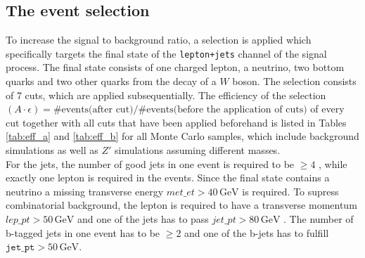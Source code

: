 \subsection{The event selection}
To increase the signal to background ratio, a selection is applied which specifically targets the final state of the \texttt{lepton+jets}
channel of the signal process.
The final state consists of one charged lepton, a neutrino, two bottom quarks and two other quarks from the
decay of a $W$ boson. The selection consists of 7 cuts, which are applied subsequentially.
The efficiency of the selection $(A \cdot \epsilon) = \# \text{events(after cut)} / \# \text{events(before the application of cuts)}$ of every cut together with all
cuts that have been applied beforehand is listed in Tables \ref{tab:eff_a} and \ref{tab:eff_b} for all Monte Carlo samples, which include background simulations as well as $Z\prime$ simulations assuming different masses.\\
For the jets, the number of good jets in one event is required to be $\geq 4$
, while exactly one lepton is required
in the events. Since the final state contains a neutrino
a missing
transverse energy $met\_et > 40 \, \si{\giga\eV}$
 is required. To supress combinatorial background,
the lepton is required to have a transverse momentum $lep\_pt > 50 \, \si{\giga\eV}$
 and one of
the jets has to pass $jet\_pt > 80 \, \si{\giga\eV}$
. The number of b-tagged jets in one event has to be
$\geq 2$
 and one of the b-jets has to fulfill $\texttt{jet\_pt} > 50 \, \si{\giga\eV}$.%
